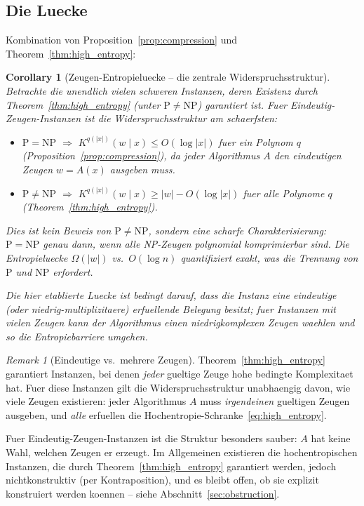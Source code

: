 \documentclass[aps,prd,twocolumn,superscriptaddress,nofootinbib]{revtex4-2}
\newtheorem{corollary}[theorem]{Corollary}
\theoremstyle{definition}
\theoremstyle{remark}
\newtheorem{remark}[theorem]{Remark}
\newcommand{\NP}{\mathrm{NP}}
\newcommand{\PP}{\mathrm{P}}
\begin{document}
\subsection{Die Luecke}

Kombination von Proposition~\ref{prop:compression} und Theorem~\ref{thm:high_entropy}:

\begin{corollary}[Zeugen-Entropieluecke -- die zentrale Widerspruchsstruktur]
\label{cor:gap}
Betrachte die unendlich vielen schweren Instanzen, deren Existenz durch Theorem~\ref{thm:high_entropy} (unter $\PP \neq \NP$) garantiert ist. Fuer Eindeutig-Zeugen-Instanzen ist die Widerspruchsstruktur am schaerfsten:
\begin{itemize}
\item $\PP = \NP$ $\Rightarrow$ $K^{q(|x|)}(w \mid x) \leq O(\log |x|)$ fuer ein Polynom $q$ (Proposition~\ref{prop:compression}), da jeder Algorithmus $A$ den eindeutigen Zeugen $w = A(x)$ ausgeben muss.
\item $\PP \neq \NP$ $\Rightarrow$ $K^{q(|x|)}(w \mid x) \geq |w| - O(\log |x|)$ fuer alle Polynome $q$ (Theorem~\ref{thm:high_entropy}).
\end{itemize}
Dies ist kein Beweis von $\PP \neq \NP$, sondern eine scharfe Charakterisierung: $\PP = \NP$ genau dann, wenn alle NP-Zeugen polynomial komprimierbar sind. Die Entropieluecke $\Omega(|w|)$ vs.\ $O(\log n)$ quantifiziert exakt, was die Trennung von $\PP$ und $\NP$ erfordert.

Die hier etablierte Luecke ist bedingt darauf, dass die Instanz eine eindeutige (oder niedrig-multiplizitaere) erfuellende Belegung besitzt; fuer Instanzen mit vielen Zeugen kann der Algorithmus einen niedrigkomplexen Zeugen waehlen und so die Entropiebarriere umgehen.
\end{corollary}

\begin{remark}[Eindeutige vs.\ mehrere Zeugen]
Theorem~\ref{thm:high_entropy} garantiert Instanzen, bei denen \textit{jeder} gueltige Zeuge hohe bedingte Komplexitaet hat. Fuer diese Instanzen gilt die Widerspruchsstruktur unabhaengig davon, wie viele Zeugen existieren: jeder Algorithmus $A$ muss \textit{irgendeinen} gueltigen Zeugen ausgeben, und \textit{alle} erfuellen die Hochentropie-Schranke~\eqref{eq:high_entropy}.

Fuer Eindeutig-Zeugen-Instanzen ist die Struktur besonders sauber: $A$ hat keine Wahl, welchen Zeugen er erzeugt. Im Allgemeinen existieren die hochentropischen Instanzen, die durch Theorem~\ref{thm:high_entropy} garantiert werden, jedoch nichtkonstruktiv (per Kontraposition), und es bleibt offen, ob sie explizit konstruiert werden koennen -- siehe Abschnitt~\ref{sec:obstruction}.
\end{remark}
\end{document}
